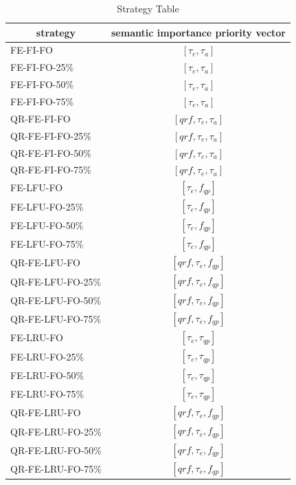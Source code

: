\begin{table}[!htbp]
\centering
\caption{Strategy Table}
\label{tab:sct}
\begin{tabular}{|l|c|}
\hline
\multicolumn{1}{|c|}{strategy} & semantic importance priority vector \\ \hline
FE-FI-FO & $[\tau_{e}, \tau_{a}]$ \\ \hline
FE-FI-FO-25\% & $[\tau_{e}, \tau_{a}]$ \\ \hline
FE-FI-FO-50\% & $[\tau_{e}, \tau_{a}]$ \\ \hline
FE-FI-FO-75\% & $[\tau_{e}, \tau_{a}]$ \\ \hline
QR-FE-FI-FO & $[qrf, \tau_{e}, \tau_{a}]$ \\ \hline
QR-FE-FI-FO-25\% & $[qrf, \tau_{e}, \tau_{a}]$ \\ \hline
QR-FE-FI-FO-50\% & $[qrf, \tau_{e}, \tau_{a}]$ \\ \hline
QR-FE-FI-FO-75\% & $[qrf, \tau_{e}, \tau_{a}]$ \\ \hline
FE-LFU-FO & $[\tau_{e}, f_{qp}]$ \\ \hline
FE-LFU-FO-25\% & $[\tau_{e}, f_{qp}]$ \\ \hline
FE-LFU-FO-50\% & $[\tau_{e}, f_{qp}]$ \\ \hline
FE-LFU-FO-75\% & $[\tau_{e}, f_{qp}]$ \\ \hline
QR-FE-LFU-FO & $[qrf, \tau_{e}, f_{qp}]$ \\ \hline
QR-FE-LFU-FO-25\% & $[qrf, \tau_{e}, f_{qp}]$ \\ \hline
QR-FE-LFU-FO-50\% & $[qrf, \tau_{e}, f_{qp}]$ \\ \hline
QR-FE-LFU-FO-75\% & $[qrf, \tau_{e}, f_{qp}]$ \\ \hline
FE-LRU-FO & $[\tau_{e}, \tau_{qp}]$ \\ \hline
FE-LRU-FO-25\% & $[\tau_{e}, \tau_{qp}]$ \\ \hline
FE-LRU-FO-50\% & $[\tau_{e}, \tau_{qp}]$ \\ \hline
FE-LRU-FO-75\% & $[\tau_{e}, \tau_{qp}]$ \\ \hline
QR-FE-LRU-FO & $[qrf, \tau_{e}, f_{qp}]$ \\ \hline
QR-FE-LRU-FO-25\% & $[qrf, \tau_{e}, f_{qp}]$ \\ \hline
QR-FE-LRU-FO-50\% & $[qrf, \tau_{e}, f_{qp}]$ \\ \hline
QR-FE-LRU-FO-75\% & $[qrf, \tau_{e}, f_{qp}]$ \\ \hline
\end{tabular}
\end{table}

